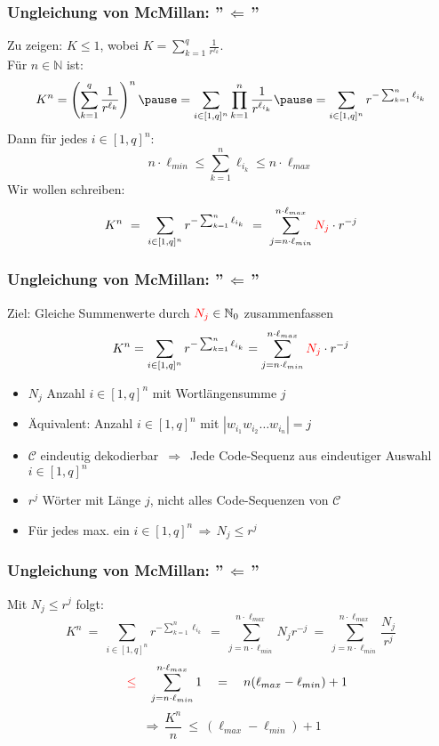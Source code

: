 \documentclass{beamer}
\begin{document}
\begin{frame}[t]
    \frametitle{Ungleichung von McMillan: ''$\,\Longleftarrow\,$''}
        Zu zeigen: $K \leq 1$, wobei
        $\displaystyle
            K = \sum_{k=1}^{q} \frac{1}{r^{\ell_k}}
        $.\\
        \pause
        Für $n \in \mathbb{N}$ ist:
        $$
            K^n = \left(\sum_{k=1}^{q} \frac{1}{r^{\ell_k}}\right)^n
            \pause
            = \sum_{i \in [1,q]^n} \prod_{k=1}^{n} \frac{1}{r^{\ell_{i_k}}}
            \pause
            = \sum_{i\in [1,q]^n} r^{-\sum_{k=1}^{n} \ell_{i_k}}
        $$\pause
        Dann für jedes $i \in [1,q]^n:$
        $$
            n\cdot \ell_{min} \leq \sum_{k=1}^{n} \ell_{i_k} \leq n\cdot \ell_{max}
        $$
        \pause
        Wir wollen schreiben:
        $$
            K^n
            \ =\ \sum_{i\in [1,q]^n} r^{-\sum_{k=1}^{n} \ell_{i_k}}
            \ =\ \sum_{j=n\cdot \ell_{min}}^{n\cdot \ell_{max}} {\color{red}N_j}\cdot r^{-j}
        $$
\end{frame}

\begin{frame}[t]
    \frametitle{Ungleichung von McMillan: ''$\,\Longleftarrow\,$''}
    Ziel: Gleiche Summenwerte durch ${\color{red}N_j} \in \mathbb{N}_0$ zusammenfassen
    $$
        K^n = \sum_{i\in [1,q]^n} r^{-\sum_{k=1}^{n} \ell_{i_k}}
        = \sum_{j=n\cdot\ell_{min}}^{n\cdot\ell_{max}} {\color{red}N_j} \cdot r^{-j}
    $$
    \pause

    \begin{itemize}
        \setlength\itemsep{1em}
        \item $N_j$ Anzahl $i \in [1,q]^n$ mit Wortlängensumme $j$
        \pause
        \item Äquivalent: Anzahl $i \in [1,q]^n$ mit $|w_{i_1}w_{i_2}\dots w_{i_n}| = j$
        \pause
        \item $\mathcal{C}$ eindeutig dekodierbar
            $\,\Longrightarrow\,$ Jede Code-Sequenz aus eindeutiger Auswahl
                $i \in [1,q]^n$
        \pause
    \item $r^j$ Wörter mit Länge $j$, nicht alles Code-Sequenzen von $\mathcal{C}$
    \item Für jedes max. ein $i \in [1,q]^n \,\Longrightarrow\, N_j \leq r^j$
    \end{itemize}

\end{frame}

\begin{frame}[t]
    \frametitle{Ungleichung von McMillan: ''$\,\Longleftarrow\,$''}
        Mit {$N_j \leq r^j$} folgt:
        $$
            K^n
            \ =\ \sum_{i\in [1,q]^n} r^{-\sum_{k=1}^{n} \ell_{i_k}}
            \ =\ \sum_{j = n\cdot \ell_{min}}^{n\cdot \ell_{max}} N_jr^{-j}
            \ =\ \sum_{j = n\cdot\ell_{min}}^{n\cdot\ell_{max}} \frac{N_j}{r^j}
        $$
        \pause
        $$
            \quad{\color{red}\leq}\quad \sum_{j = n\cdot\ell_{min}}^{n\cdot\ell_{max}} 1
            \quad=\quad n(\ell_{max}-\ell_{min}) + 1
        $$
        \pause
        $$
            \,\Longrightarrow\, \frac{K^n}{n}\ \leq\ (\ell_{max}-\ell_{min}) + 1
        $$
\end{frame}
\end{document}
